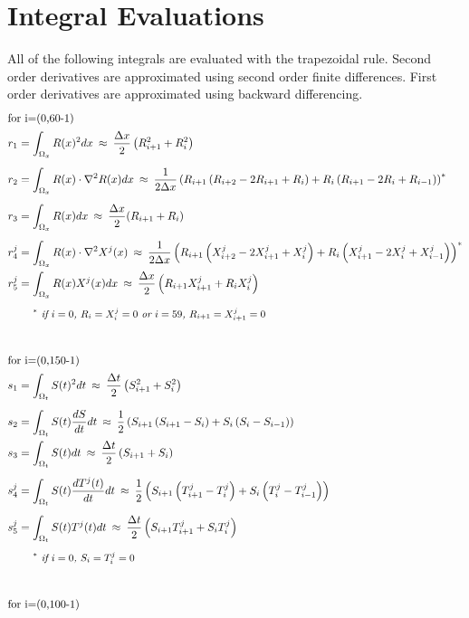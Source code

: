 \documentclass{article}
\def\ds{\displaystyle}
\def\grad{\mathbf\nabla}
\begin{document}
\section*{Integral Evaluations}
All of the following integrals are evaluated with the trapezoidal rule. Second order derivatives are approximated using second order finite differences. First order derivatives are approximated using backward differencing. 
\begin{align*}
\intertext{for i=(0,60-1)}
r_1 &= \ds\int_{\Omega_x} R(x)^2 dx \: \approx \: \frac{\Delta x}{2} \left( R_{i+1}^2 + R_i^2 \right) \\[5pt]
r_2 &= \int_{\Omega_x} R(x)\cdot\grad^2R(x) dx \: \approx \: \frac{1}{2\Delta x} \left( R_{i+1} \left( R_{i+2}-2R_{i+1}+R_{i} \right) + R_{i} \left( R_{i+1}-2R_{i}+R_{i-1} \right) \right)^*\\[5pt]
r_3 &= \ds\int_{\Omega_x} R(x)dx \: \approx \: \frac{\Delta x}{2} (R_{i+1} + R_i) \\[5pt]
r^j_4 &= \ds\int_{\Omega_x} R(x)\cdot\grad^2X^j(x) \: \approx \: \frac{1}{2\Delta x} \left( R_{i+1} \left( X^j_{i+2}-2X^j_{i+1}+X^j_{i}\right) + R_i \left(X^j_{i+1}-2X^j_i+X^j_{i-1}\right) \right)^*\\
r^j_5 &= \ds\int_{\Omega_x} R(x) X^j(x) dx \: \approx \: \frac{\Delta x}{2} \left( R_{i+1}X^j_{i+1} + R_iX^j_i \right) \\[5pt]
        &\text{\small{\emph{$\quad\:\:^*$ if $i=0$, $R_i=X^j_i=0$ or $i=59$, $R_{i+1}=X^j_{i+1}=0$}}} \\[25pt]
\intertext{for i=(0,150-1)}
s_1 &= \ds\int_{\Omega_t} S(t)^2 dt \: \approx \: \frac{\Delta t}{2} \left( S_{i+1}^2 + S_i^2 \right) \\[5pt]
s_2 &= \ds\int_{\Omega_t} S(t)\frac{dS}{dt}dt \: \approx \: \frac{1}{2} \left( S_{i+1}\left( S_{i+1}-S_i \right) + S_i\left(S_i-S_{i-1}\right) \right) \\
s_3 &= \ds\int_{\Omega_t} S(t) dt \: \approx \: \frac{\Delta t}{2} \left( S_{i+1} + S_i \right) \\[5pt]
s^j_4 &= \ds\int_{\Omega_t} S(t)\frac{dT^j(t)}{dt} dt \: \approx \: \frac{1}{2} \left( S_{i+1} \left(T^j_{i+1}-T^j_i \right) + S_i\left(T^j_i-T^j_{i-1}\right) \right) \\[5pt]
s^j_5 &= \ds\int_{\Omega_t}S(t)T^j(t) dt \: \approx \: \frac{\Delta t}{2} \left(S_{i+1}T^j_{i+1} + S_iT^j_i \right) \\[5pt]
        &\text{\small{\emph{$\quad\:\:^*$ if $i=0$, $S_i=T^j_i=0$}}} \\[25pt]
\intertext{for i=(0,100-1)}

\end{align*}
\end{document}

